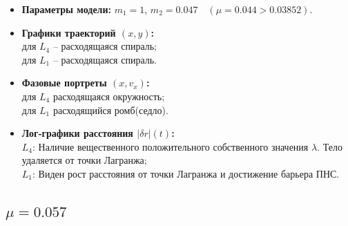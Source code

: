 \documentclass[12pt]{article}
\begin{document}
\begin{itemize}
  \item \textbf{Параметры модели:} $m_1=1$, $m_2=0.047\quad(\mu=0.044>0.03852)$.
  \item \textbf{Графики траекторий $(x,y)$:}\\
        для $L_4$ -- расходящаяся спираль;\\
        для $L_1$ -- расходящаяся спираль. 
  \item \textbf{Фазовые портреты $(x,v_x)$:}\\
        для $L_4$ расходящаяся окружность;\\
        для $L_1$ расходящийся ромб(седло).
  \item \textbf{Лог‑графики расстояния $|\delta r|(t)$:}\\
        $L_4$:  Наличие вещественного положительного собственного значения $\lambda$. Тело удаляется от точки Лагранжа;\\
        $L_1$: Виден рост расстояния от точки Лагранжа и достижение барьера ПНС.
\end{itemize}

\subsection{$\mu=0.057$} 
\end{document}
